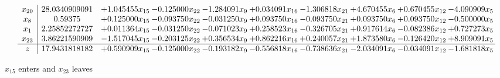 \documentclass[10pt]{article}
\begin{document}
\[\begin{array}{c| c c@{\hskip 2pt} c@{\hskip 2pt} c@{\hskip 2pt} c@{\hskip 2pt} c@{\hskip 2pt} c@{\hskip 2pt} c@{\hskip 2pt} c@{\hskip 2pt} }
 x_{20}   &  28.0340909091 & + 1.045455 x_{15} & -0.125000 x_{22} & -1.284091 x_{9} & + 0.034091 x_{16} & -1.306818 x_{21} & + 4.670455 x_{6} & + 0.670455 x_{12} & -4.090909 x_{5}\\
 x_{8}   &  0.59375 & + 0.125000 x_{15} & -0.093750 x_{22} & -0.031250 x_{9} & + 0.093750 x_{16} & -0.093750 x_{21} & + 0.093750 x_{6} & + 0.093750 x_{12} & -0.500000 x_{5}\\
 x_{1}   &  2.25852272727 & + 0.011364 x_{15} & -0.031250 x_{22} & -0.071023 x_{9} & + 0.258523 x_{16} & -0.326705 x_{21} & + 0.917614 x_{6} & -0.082386 x_{12} & + 0.727273 x_{5}\\
 x_{23}   &  3.86221590909 & -1.517045 x_{15} & -0.203125 x_{22} & + 0.356534 x_{9} & + 0.862216 x_{16} & + 0.240057 x_{21} & + 1.873580 x_{6} & -0.126420 x_{12} & + 8.909091 x_{5}\\
\hline
z    &  17.9431818182 & + 0.590909 x_{15} & -0.125000 x_{22} & -0.193182 x_{9} & -0.556818 x_{16} & -0.738636 x_{21} & -2.034091 x_{6} & -0.034091 x_{12} & -1.681818 x_{5}\\
\end{array}\]


 $ x_{15} $ enters and $ x_{23} $ leaves 
\end{document}
